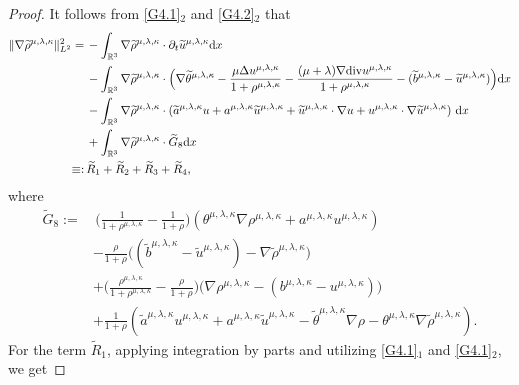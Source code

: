 \documentclass[reqno,11pt]{amsart}
\theoremstyle{plain}
\numberwithin{equation}{section}
\begin{document}
\begin{proof}
It follows from \eqref{G4.1}$_2$ and \eqref{G4.2}$_2$ that
\begin{align}\label{G4.37}
 \|\nabla   \widetilde{\rho}^{\mu,\lambda,\kappa} \|_{L^2}^2
 =\, & -\int_{\mathbb{R}^3} \nabla    \widetilde{\rho}^{\mu,\lambda,\kappa}  \cdot \partial_t \widetilde{u}^{\mu,\lambda,\kappa} \mathrm{d} x\nonumber \\
 & -\int_{\mathbb{R}^3} \nabla    \widetilde{\rho}^{\mu,\lambda,\kappa}\cdot\Big(\nabla\widetilde{\theta}^{\mu,\lambda,\kappa}-\frac{\mu\Delta {u}^{\mu,\lambda,\kappa}}{1+\rho^{\mu,\lambda,\kappa}}-\frac{(\mu+\lambda)\nabla{\rm div} {u}^{\mu,\lambda,\kappa}}{1+\rho^{\mu,\lambda,\kappa}}-(\widetilde{b}^{\mu,\lambda,\kappa}-\widetilde{u}^{\mu,\lambda,\kappa})\Big)   \mathrm{d} x\nonumber \\
& -\int_{\mathbb{R}^3} \nabla   \widetilde{\rho}^{\mu,\lambda,\kappa}\cdot   ( \widetilde{a}^{\mu,\lambda,\kappa} u+a^{\mu,\lambda,\kappa}\widetilde{u}^{\mu,\lambda,\kappa}+\widetilde{u}^{\mu,\lambda,\kappa}\cdot\nabla u+u^{\mu,\lambda,\kappa}\cdot\nabla\widetilde{u}^{\mu,\lambda,\kappa} )\ \mathrm{d} x\nonumber\\
&+ \int_{\mathbb{R}^3}  \nabla   \widetilde{\rho}^{\mu,\lambda,\kappa}\cdot \widetilde{G}_8 \mathrm{d} x\nonumber\\  
\equiv:\,& \widetilde{R}_1 +\widetilde{R}_2+\widetilde{R}_3+\widetilde{R}_4,
\end{align}
where  
\begin{align*}
\widetilde{G}_8:=&\,\Big(\frac{1}{1+ \rho^{\mu,\lambda,\kappa}}-\frac{1}{1+\rho}    \Big)(\theta^{\mu,\lambda,\kappa}\nabla\rho^{\mu,\lambda,\kappa}+a^{\mu,\lambda,\kappa} u^{\mu,\lambda,\kappa})\nonumber\\
& -\frac{\rho}{1+\rho}\big((\widetilde{b}^{\mu,\lambda,\kappa}-\widetilde{u}^{\mu,\lambda,\kappa})-\nabla\widetilde{\rho}^{\mu,\lambda,\kappa}\big) \nonumber\\
&+\Big(\frac{\rho^{\mu,\lambda,\kappa}}{1+ \rho^{\mu,\lambda,\kappa}}-\frac{\rho}{1+\rho}    \Big)\big(\nabla\rho^{\mu,\lambda,\kappa}-(b^{\mu,\lambda,\kappa}-u^{\mu,\lambda,\kappa})\big)   \nonumber\\ 
&+\frac{1}{1+\rho}(\widetilde{a}^{\mu,\lambda,\kappa} u^{\mu,\lambda,\kappa}+a^{\mu,\lambda,\kappa}\widetilde{u}^{\mu,\lambda,\kappa}-\widetilde\theta^{\mu,\lambda,\kappa}\nabla\rho-\theta^{\mu,\lambda,\kappa}\nabla\widetilde{\rho}^{\mu,\lambda,\kappa}).
\end{align*} 
For the term $\widetilde{R}_1$, applying integration by parts and utilizing \eqref{G4.1}$_1$ and \eqref{G4.1}$_2$, we get  

\end{proof}
\end{document}
